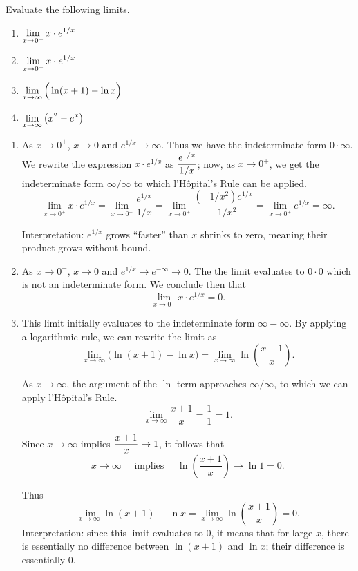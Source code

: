 \begin{example} \label{Ex:3.7.Eg1}
Evaluate the following limits.
\bmtwo
\begin{enumerate}[1)]
\item $\displaystyle \lim_{x\to0^+} x\cdot e^{1/x}$
\item	 $\displaystyle \lim_{x\to0^-} x\cdot e^{1/x}$
\item	 $\displaystyle \lim_{x\to\infty} \Big( \ln(x+1)-\ln x \Big)$
\item	 $\displaystyle \lim_{x\to\infty} \big( x^2-e^x \big)$
\end{enumerate}
\emtwo

\solution
\begin{enumerate}[1)]
\item	As $x\rightarrow 0^+$, $x\rightarrow 0$ and $e^{1/x}\rightarrow \infty$. Thus we have the indeterminate form $0\cdot\infty$. We rewrite the expression $x\cdot e^{1/x}$ as $\displaystyle\frac{e^{1/x}}{1/x}$; now, as $x\rightarrow 0^+$, we get the indeterminate form $\infty/\infty$ to which l'H\^opital's Rule can be applied. 
$$ \lim_{x\to0^+} x\cdot e^{1/x} = \lim_{x\to 0^+} \frac{e^{1/x}}{1/x} = \lim_{x\to 0^+}\frac{(-1/x^2)e^{1/x}}{-1/x^2} =\lim_{x\to 0^+}e^{1/x} =\infty.$$

Interpretation: $e^{1/x}$ grows ``faster'' than $x$ shrinks to zero, meaning their product grows without bound.

\item	As $x\rightarrow 0^-$, $x\rightarrow 0$ and $e^{1/x}\rightarrow e^{-\infty}\rightarrow 0$. The the limit evaluates to $0\cdot 0$ which is not an indeterminate form. We conclude then that $$\lim_{x\to 0^-}x\cdot e^{1/x} = 0.$$

\item	This limit initially evaluates to the indeterminate form $\infty-\infty$. By applying a logarithmic rule, we can rewrite the limit as 
$$ \lim_{x\to\infty} \Big( \ln(x+1)-\ln x \Big) = \lim_{x\to \infty} \ln \left(\frac{x+1}x\right).$$

As $x\rightarrow \infty$, the argument of the $\ln$ term approaches $\infty/\infty$, to which we can apply l'H\^opital's Rule.
$$\lim_{x\to\infty} \frac{x+1}x = \frac11=1.$$

Since $x\rightarrow \infty$ implies $\displaystyle\frac{x+1}x\rightarrow 1$, it follows that 
$$x\rightarrow \infty \quad \text{ implies }\quad \ln\left(\frac{x+1}x\right)\rightarrow \ln 1=0.$$

Thus $$ \lim_{x\to\infty} \ln(x+1)-\ln x = \lim_{x\to \infty} \ln \left(\frac{x+1}x\right)=0.$$
Interpretation: since this limit evaluates to $0$, it means that for large $x$, there is essentially no difference between $\ln (x+1)$ and $\ln x$; their difference is essentially $0$.


\end{enumerate}
\end{example}
